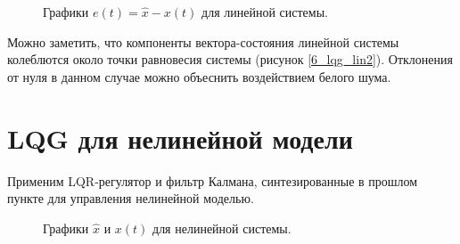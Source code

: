 \begin{figure}[!h]
	\caption{Графики $e(t) =\hat{x}- x(t)$ для линейной системы.}
	\label{6_lqg_lin2_e}
\end{figure}

Можно заметить, что компоненты вектора-состояния линейной системы колеблются около точки равновесия системы (рисунок \ref{6_lqg_lin2}). Отклонения от нуля в данном случае можно объеснить воздействием белого шума.


\section{LQG для нелинейной модели}

Применим LQR-регулятор и фильтр Калмана, синтезированные в прошлом пункте для управления нелинейной моделью.

\begin{figure}[!h]
	\caption{Графики $\hat{x}$ и $x(t)$ для нелинейной системы.}
	\label{6_lqg_nonlin2_x}
\end{figure}

